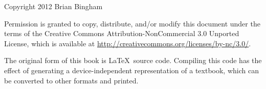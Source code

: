 \documentclass[11pt]{book}
\newcommand{\thisgls}{temp}  %
\begin{document}
\maketitle
\vspace{2in} %
 
\begin{center}
{\Large \thetitle}
\vspace{0.5in}

Copyright 2012 Brian Bingham
\end{center}

Permission is granted to copy, distribute, and/or modify this document
under the terms of the Creative Commons Attribution-NonCommercial 3.0 Unported
License, which is available at \url{http://creativecommons.org/licenses/by-nc/3.0/}.

The original form of this book is \LaTeX\ source code.  Compiling this
code has the effect of generating a device-independent representation
of a textbook, which can be converted to other formats and printed.


\setcounter{tocdepth}{1}
\tableofcontents

\mainmatter


\renewcommand{\thisgls}{dataacq}


\printglossary[type=\thisgls]
\glsresetall

\renewcommand{\thisgls}{measure}


\printglossary[type=\thisgls]
\glsresetall

\renewcommand{\thisgls}{model1}


\printglossary[type=\thisgls]
\glsresetall

\renewcommand{\thisgls}{compare}


\printglossary[type=\thisgls]
\glsresetall

\renewcommand{\thisgls}{strain}


\printglossary[type=\thisgls]
\glsresetall

\renewcommand{\thisgls}{linear}


\printglossary[type=\thisgls]
\glsresetall

%
%






\end{document}
